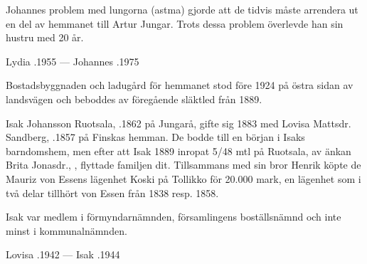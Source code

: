Johannes problem med lungorna (astma) gjorde att de tidvis måste arrendera ut en del av hemmanet till Artur Jungar. Trots dessa problem överlevde han sin hustru med 20 år.
\begin{jhchildren}
  \item {}
  \item {}
\end{jhchildren}

Lydia .1955  ---  Johannes .1975



Bostadsbyggnaden och ladugård för hemmanet stod före 1924 på östra sidan av landsvägen och beboddes av föregående släktled från 1889.


Isak Johansson Ruotsala, .1862 på Jungarå,  gifte sig 1883 med Lovisa Mattsdr. Sandberg, .1857 på Finskas hemman. De bodde till en början i Isaks barndomshem, men efter att Isak 1889 inropat 5/48 mtl på Ruotsala, av änkan Brita Jonasdr., , flyttade familjen dit. Tillsammans med sin bror Henrik köpte de Mauriz von Essens lägenhet Koski på Tollikko för 20.000 mark, en lägenhet som i två delar tillhört von Essen från 1838 resp. 1858.

Isak var medlem i förmyndarnämnden, församlingens boställsnämnd och inte minst i kommunalnämnden.
\begin{jhchildren}
  \item {}
  \item {}
  \item {}
  \item {}
  \item {}
  \item {}
  \item {}
\end{jhchildren}

Lovisa .1942  ---  Isak .1944



